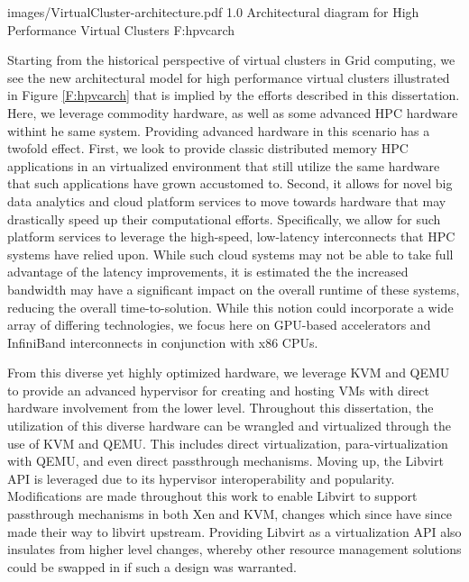  {images/VirtualCluster-architecture.pdf}
  {1.0}
  {Architectural diagram for High Performance Virtual Clusters}
  {F:hpvcarch}

Starting from the historical perspective of virtual clusters in Grid computing, we see the new architectural model for high performance virtual clusters illustrated in Figure \ref{F:hpvcarch} that is implied by the efforts described in this dissertation.  Here, we leverage commodity hardware, as well as some advanced HPC hardware withint he same system. Providing advanced hardware in this scenario has a twofold effect. First, we look to provide classic distributed memory HPC applications in an virtualized environment that still utilize the same hardware that such applications have grown accustomed to.  Second, it allows for novel big data analytics and cloud platform services to move towards hardware that may drastically speed up their computational efforts. Specifically, we allow for such platform services to leverage the high-speed, low-latency interconnects that HPC systems have relied upon. While such cloud systems may not be able to take full advantage of the latency improvements, it is estimated the the increased bandwidth may have a significant impact on the overall runtime of these systems, reducing the overall time-to-solution. While this notion could incorporate a wide array of differing technologies, we focus here on GPU-based accelerators and InfiniBand interconnects in conjunction with x86 CPUs. 

From this diverse yet highly optimized hardware, we leverage KVM and QEMU to provide an advanced hypervisor for creating and hosting VMs with direct hardware involvement from the lower level.  Throughout this dissertation, the utilization of this diverse hardware can be wrangled and virtualized through the use of KVM and QEMU. This includes direct virtualization, para-virtualization with QEMU, and even direct passthrough mechanisms.  Moving up, the Libvirt API is leveraged due to its hypervisor interoperability and popularity. Modifications are made throughout this work to enable Libvirt to support passthrough mechanisms in both Xen and KVM, changes which since have since made their way to libvirt upstream.  Providing Libvirt as a virtualization API also insulates from higher level changes, whereby other resource management solutions could be swapped in if such a design was warranted. 

